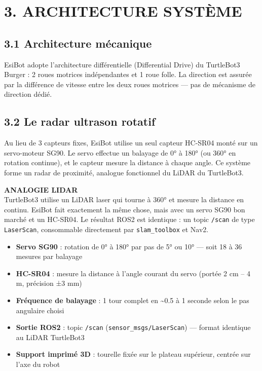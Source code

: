 \documentclass[12pt,a4paper]{article}
\begin{document}
\section{3. ARCHITECTURE SYSTÈME}

\subsection{3.1 Architecture mécanique}

EsiBot adopte l'architecture différentielle (Differential Drive) du TurtleBot3 Burger : 2 roues motrices indépendantes et 1 roue folle. La direction est assurée par la différence de vitesse entre les deux roues motrices — pas de mécanisme de direction dédié.

\subsection{3.2 Le radar ultrason rotatif}

Au lieu de 3 capteurs fixes, EsiBot utilise un seul capteur HC-SR04 monté sur un servo-moteur SG90. Le servo effectue un balayage de 0° à 180° (ou 360° en rotation continue), et le capteur mesure la distance à chaque angle. Ce système forme un radar de proximité, analogue fonctionnel du LiDAR du TurtleBot3.

\begin{conceptbox}
\textbf{ANALOGIE LIDAR}\\[4pt]
TurtleBot3 utilise un LiDAR laser qui tourne à 360° et mesure la distance en continu. EsiBot fait exactement la même chose, mais avec un servo SG90 bon marché et un HC-SR04. Le résultat ROS2 est identique : un topic \texttt{/scan} de type \texttt{LaserScan}, consommable directement par \texttt{slam\_toolbox} et Nav2.
\end{conceptbox}

\begin{itemize}
  \item \textbf{Servo SG90} : rotation de 0° à 180° par pas de 5° ou 10° — soit 18 à 36 mesures par balayage
  \item \textbf{HC-SR04} : mesure la distance à l'angle courant du servo (portée 2 cm – 4 m, précision ±3 mm)
  \item \textbf{Fréquence de balayage} : 1 tour complet en \textasciitilde0.5 à 1 seconde selon le pas angulaire choisi
  \item \textbf{Sortie ROS2} : topic \texttt{/scan} (\texttt{sensor\_msgs/LaserScan}) — format identique au LiDAR TurtleBot3
  \item \textbf{Support imprimé 3D} : tourelle fixée sur le plateau supérieur, centrée sur l'axe du robot
\end{itemize}
\end{document}
